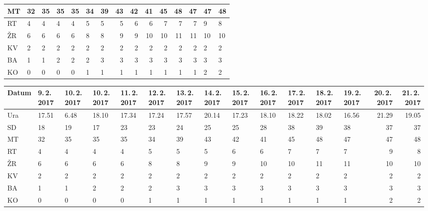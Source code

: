 \documentclass[12pt, a4paper, oneside]{report}
\begin{document}
\begin{table}
\begin{tabular}{|HHHHHHHr|r|r|r|r|rHH|}
    MT & 32 & 35 & 35 & 35 & 34 & 39 & 43 & 42 & 41 & 45 & 48 & 47 & 47 & 48 \\ \hline
    RT & 4 & 4 & 4 & 4 & 5 & 5 & 5 & 6 & 6 & 7 & 7 & 7 & 9 & 8 \\ \hline
    ŽR & 6 & 6 & 6 & 6 & 8 & 8 & 9 & 9 & 10 & 10 & 11 & 11 & 10 & 10 \\ \hline
    KV & 2 & 2 & 2 & 2 & 2 & 2 & 2 & 2 & 2 & 2 & 2 & 2 & 2 & 2 \\ \hline
    BA & 1 & 1 & 2 & 2 & 2 & 3 & 3 & 3 & 3 & 3 & 3 & 3 & 3 & 3 \\ \hline
    KO & 0 & 0 & 0 & 0 & 1 & 1 & 1 & 1 & 1 & 1 & 1 & 1 & 2 & 2 \\ \hline \hline
  \end{tabular}
  \begin{tabular}{|HHHHHHHHHHHHHr|r||}
    \hline \hline
    Datum & 9.\,2.\,2017 & 10.\,2.\,2017 & 10.\,2.\,2017 & 11.\,2.\,2017 & 12.\,2.\,2017 & 13.\,2.\,2017 & 14.\,2.\,2017 & 15.\,2.\,2017 & 16.\,2.\,2017 & 17.\,2.\,2017 & 18.\,2.\,2017 & 19.\,2.\,2017 & 20.\,2.\,2017 & 21.\,2.\,2017 \\ \hline
    Ura & 17.51	& 6.48	& 18.10	& 17.34	& 17.24	& 17.57	& 20.14	& 17.23	& 18.10	& 18.22	& 18.02	& 16.56	& 21.29	& 19.05 \\ \hline \hline
    SD & 18 & 19 & 17 & 23 & 23 & 24 & 25 & 25 & 28 & 38 & 39 & 38 & 37 & 37 \\ \hline
    MT & 32 & 35 & 35 & 35 & 34 & 39 & 43 & 42 & 41 & 45 & 48 & 47 & 47 & 48 \\ \hline
    RT & 4 & 4 & 4 & 4 & 5 & 5 & 5 & 6 & 6 & 7 & 7 & 7 & 9 & 8 \\ \hline
    ŽR & 6 & 6 & 6 & 6 & 8 & 8 & 9 & 9 & 10 & 10 & 11 & 11 & 10 & 10 \\ \hline
    KV & 2 & 2 & 2 & 2 & 2 & 2 & 2 & 2 & 2 & 2 & 2 & 2 & 2 & 2 \\ \hline
    BA & 1 & 1 & 2 & 2 & 2 & 3 & 3 & 3 & 3 & 3 & 3 & 3 & 3 & 3 \\ \hline
    KO & 0 & 0 & 0 & 0 & 1 & 1 & 1 & 1 & 1 & 1 & 1 & 1 & 2 & 2 \\ \hline \hline
  \end{tabular}
\end{table}
\clearpage
\end{document}
